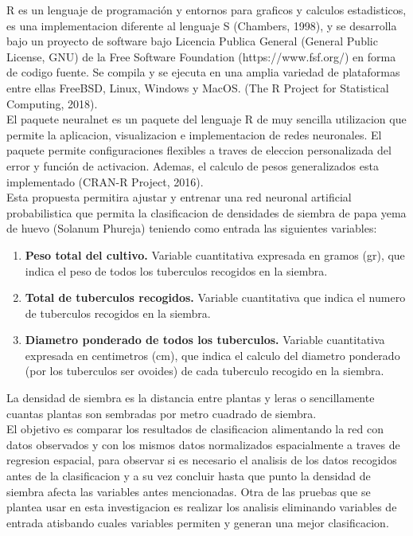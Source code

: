 R es un lenguaje de programación y entornos para graficos y calculos estadisticos, es una implementacion diferente al lenguaje S (Chambers, 1998), y se desarrolla bajo un proyecto de software bajo Licencia Publica General (General Public License, GNU) de la Free Software Foundation (https://www.fsf.org/) en forma de codigo fuente. Se compila y se ejecuta en una amplia variedad de plataformas entre ellas FreeBSD, Linux, Windows y MacOS. (The R Project for Statistical Computing, 2018).\\

El paquete neuralnet es un paquete del lenguaje R de muy sencilla utilizacion que permite la aplicacion, visualizacion e implementacion de redes neuronales. El paquete permite configuraciones flexibles a traves de
eleccion personalizada del error y función de activacion. Ademas, el calculo de pesos generalizados esta implementado (CRAN-R Project, 2016).\\

Esta propuesta permitira ajustar y entrenar una red neuronal artificial probabilistica que permita la clasificacion de densidades de siembra de papa yema de huevo (Solanum Phureja) teniendo como entrada las siguientes variables: 

\begin{enumerate}
    \item{\textbf{Peso total del cultivo.} Variable cuantitativa expresada en gramos (gr), que indica el peso de todos los tuberculos recogidos en la siembra.}
	\item{\textbf{Total de tuberculos recogidos.} Variable cuantitativa que indica el numero de tuberculos recogidos en la siembra.}
	\item{\textbf{Diametro ponderado de todos los tuberculos.} Variable cuantitativa expresada en centimetros (cm), que indica el calculo del diametro ponderado (por los tuberculos ser ovoides) de cada tuberculo recogido en la siembra.}
\end{enumerate}

La densidad de siembra es la distancia entre plantas y leras o sencillamente cuantas plantas son sembradas por metro cuadrado de siembra.\\

El objetivo es comparar los resultados de clasificacion alimentando la red con datos observados y con los mismos datos normalizados espacialmente a traves de regresion espacial, para observar si es necesario el analisis de los datos recogidos antes de la clasificacion y a su vez concluir hasta que punto la densidad de siembra afecta las variables antes mencionadas. Otra de las pruebas que se plantea usar en esta investigacion es realizar los analisis eliminando variables de entrada atisbando cuales variables permiten y generan una mejor clasificacion.\\

